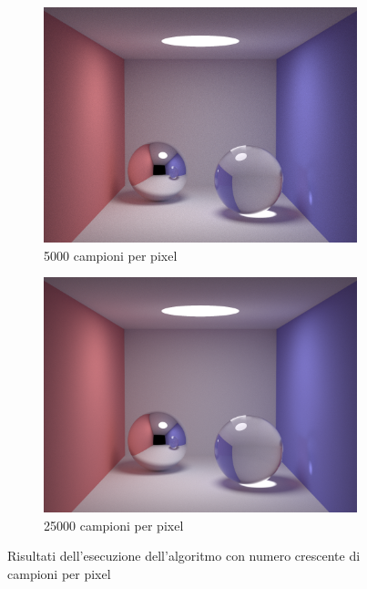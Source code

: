 \begin{figure}[tb]
\begin{subfigure}[c]{0.4\linewidth}
	\includegraphics[width=\linewidth]{../assets/appendixD_result_5k.png}
	\caption{5000 campioni per pixel}
    \end{subfigure}\hfill
    \begin{subfigure}[c]{0.4\linewidth}
	\centering
	\includegraphics[width=\linewidth]{../assets/appendixD_result_25k.png}
	\caption{25000 campioni per pixel}
    \end{subfigure}
    \caption{Risultati dell'esecuzione dell'algoritmo con numero crescente di campioni per pixel}
\end{figure}
